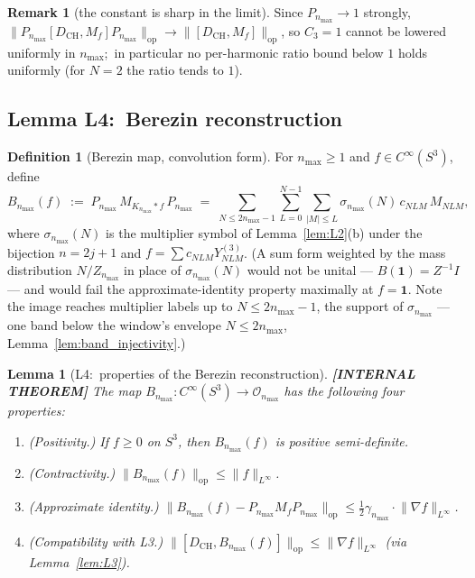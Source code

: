 \documentclass[11pt,a4paper]{article}
\theoremstyle{plain}
\newtheorem{lemma}[theorem]{Lemma}
\theoremstyle{definition}
\newtheorem{definition}[theorem]{Definition}
\newtheorem{remark}[theorem]{Remark}
\newcommand{\nmax}{n_{\max}}
\newcommand{\sthree}{S^{3}}
\newcommand{\Op}{\mathcal{O}}
\newcommand{\opnorm}[1]{\lVert #1 \rVert_{\mathrm{op}}}
\newcommand{\norm}[1]{\lVert #1 \rVert}
\newcommand{\Mat}{M}
\newcommand{\DCH}{D_{\mathrm{CH}}}
\newcommand{\KS}{K}
\begin{document}
\begin{remark}[the constant is sharp in the limit]
Since $P_{\nmax} \to 1$ strongly, $\opnorm{P_{\nmax}[\DCH,
M_f]P_{\nmax}} \to \opnorm{[\DCH, M_f]}$, so $C_3 = 1$ cannot be
lowered uniformly in $\nmax$;\ in particular no per-harmonic ratio
bound below $1$ holds uniformly (for $N = 2$ the ratio tends to $1$).
\end{remark}

\subsection{Lemma L4:\ Berezin reconstruction}
\label{sec:L4}

\begin{definition}[Berezin map, convolution form]\label{def:berezin}
For $\nmax \ge 1$ and $f \in C^\infty(\sthree)$, define
\begin{equation}\label{eq:B_def}
   B_{\nmax}(f)
   \;:=\; P_{\nmax}\,\Mat_{\KS_{\nmax} \ast f}\,P_{\nmax}
   \;=\; \sum_{N \le 2\nmax - 1}\sum_{L=0}^{N-1}\sum_{|M| \le L}
   \sigma_{\nmax}(N)\, c_{NLM}\, \Mat_{NLM},
\end{equation}
where $\sigma_{\nmax}(N)$ is the multiplier symbol of
Lemma~\ref{lem:L2}(b) under the bijection $n = 2j+1$ and
$f = \sum c_{NLM} Y^{(3)}_{NLM}$. (A sum form weighted by the mass distribution $N/Z_{\nmax}$ in
place of $\sigma_{\nmax}(N)$ would not be unital —
$B(\mathbf{1}) = Z^{-1} I$ — and would fail the approximate-identity
property maximally at $f = \mathbf{1}$. Note the image reaches
multiplier labels up to $N \le 2\nmax - 1$, the support of
$\sigma_{\nmax}$ --- one band below the window's envelope $N \le
2\nmax$, Lemma~\ref{lem:band_injectivity}.)
\end{definition}

\begin{lemma}[L4:\ properties of the Berezin reconstruction]\label{lem:L4}
\textbf{[INTERNAL THEOREM]} The map $B_{\nmax}: C^\infty(\sthree) \to \Op_{\nmax}$ has the
following four properties:
\begin{enumerate}\setlength{\itemsep}{2pt}
\item[(a)] (Positivity.) If $f \ge 0$ on $\sthree$, then $B_{\nmax}(f)$
is positive semi-definite.
\item[(b)] (Contractivity.) $\opnorm{B_{\nmax}(f)} \le \norm{f}_{L^\infty}$.
\item[(c)] (Approximate identity.)
$\opnorm{B_{\nmax}(f) - P_{\nmax} \Mat_f P_{\nmax}}
\le \tfrac12\gamma_{\nmax} \cdot \norm{\nabla f}_{L^\infty}$.
\item[(d)] (Compatibility with L3.)
$\opnorm{[\DCH, B_{\nmax}(f)]} \le \norm{\nabla f}_{L^\infty}$
(via Lemma~\ref{lem:L3}).
\end{enumerate}
\end{lemma}
\end{document}

